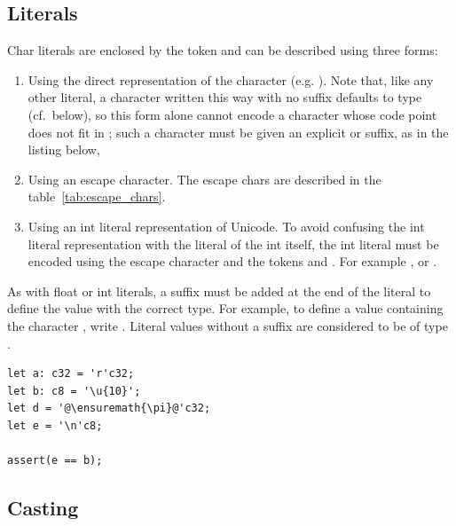 \subsection{Literals}
\label{sec:org73c4919}

Char literals are enclosed by the token  and can be described using three forms:

\begin{enumerate}
  \setlength\itemsep{-4pt}
\item Using the direct representation of the character (e.g. ). Note
  that, like any other literal, a character written this way with no suffix
  defaults to type  (cf.~below), so this form alone cannot encode a
  character whose code point does not fit in ; such a character
  must be given an explicit  or  suffix, as in the
  listing below,
\item Using an escape character. The escape chars are described in the
  table~\ref{tab:escape_chars}.

\item Using an int literal representation of Unicode. To avoid confusing the int
  literal representation with the literal of the int itself, the int literal
  must be encoded using the escape character  and the
  tokens \token{\{} and \token{\}}. For example
  ,  or
  .

\end{enumerate}

As with float or int literals, a suffix must be added at the end of the literal
to define the value with the correct type. For example, to define a 
value containing the character , write . Literal values
without a suffix are considered to be of type .

\begin{lstlisting}[style=coloredverbatim, escapechar=@]
let a: c32 = 'r'c32;
let b: c8 = '\u{10}';
let d = '@\ensuremath{\pi}@'c32;
let e = '\n'c8;

assert(e == b);
\end{lstlisting}

\subsection{Casting}
\label{sec:org16d703f}

